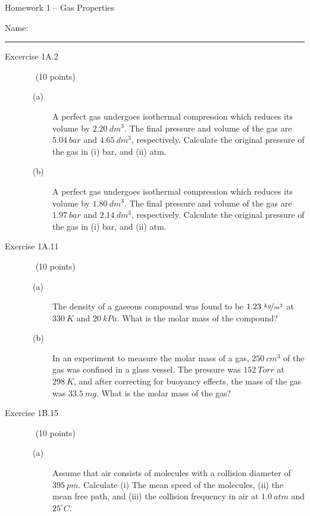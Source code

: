 \documentclass[12pt, openany, letterpaper]{memoir}
\begin{document}
\begin{center}
	{\large Homework 1 -- Gas Properties}
\end{center}

Name: \rule[-.1mm]{15em}{0.1pt}

\begin{description}
	\item [Excercise 1A.2] ~ (10 points)
	      \begin{description}
		      \item [~(a)~~] A perfect gas undergoes isothermal compression which reduces its volume by $2.20~dm^3$. The final pressure and volume of the gas are $5.04~bar$ and $4.65~dm^3$, respectively. Calculate the original pressure of the gas in (i) bar, and (ii) atm.

		            \vspace{6em}
		      \item [~(b)~~] A perfect gas undergoes isothermal compression which reduces its volume by $1.80~dm^3$. The final pressure and volume of the gas are $1.97~bar$ and $2.14~dm^3$, respectively. Calculate the original pressure of the gas in (i) bar, and (ii) atm.

		            \vspace{6em}
	      \end{description}
	\item [Exercise 1A.11] ~ (10 points)
	      \begin{description}
		      \item [~(a)~~] The density of a gaseous compound was found to be $1.23~\nicefrac{kg}{m^3}$ at $330~K$ and $20~kPa$. What is the molar mass of the compound?

		            \vspace{9em}
		      \item [~(b)~~] In an experiment to measure the molar mass of a gas, $250~cm^3$ of the gas was confined in a glass vessel. The pressure was $152~Torr$ at $298~K$, and after correcting for buoyancy effects, the mass of the gas was $33.5~mg$. What is the molar mass of the gas?

		            \vspace{9em}
	      \end{description}
	\item [Exercise 1B.15] ~ (10 points)
	      \begin{description}
		      \item [~(a)~~] Assume that air consists of  molecules with a collision diameter of $395~pm$. Calculate (i) The mean speed of the molecules, (ii) the mean free path, and (iii) the collision frequency in air at $1.0~atm$ and $25^\circ C$.


\end{description}
\end{description}
\end{document}
